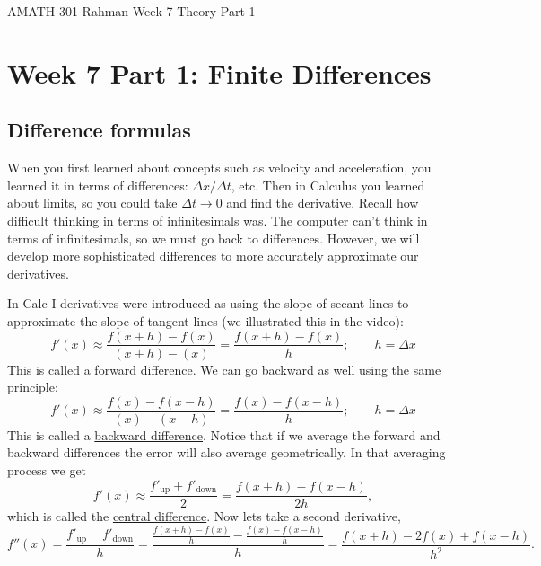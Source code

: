 \documentclass[reqno]{amsart}
\theoremstyle{definition}
\begin{document}
\begin{flushleft}
{\sc \Large AMATH 301 Rahman} \hfill Week 7 Theory Part 1
\bigskip
\end{flushleft}

\newcommand{\R}{\mathbb{R}}
\newcommand{\N}{\mathbb{N}}
\newcommand{\Z}{\mathbb{Z}}
\newcommand{\Q}{\mathbb{Q}}
\renewcommand{\CancelColor}{\color{red}}
\newcommand{\?}{\stackrel{?}{=}}
\renewcommand{\varphi}{\phi}
\newcommand{\card}{\text{Card}}
\newcommand{\bigzero}{\text{\Huge 0}}
\newcommand{\curvearrowdown}{{\color{red}\rotatebox{90}{$\curvearrowleft$}}}
\newcommand{\curvearrowup}{{\color{red}\rotatebox{90}{$\curvearrowright$}}}



\section*{Week 7 Part 1:  Finite Differences}

\subsection*{Difference formulas}

When you first learned about concepts such as velocity and acceleration, you learned it in terms of differences: $\Delta x/\Delta t$, etc.  Then in Calculus you learned about limits, so you could take $\Delta t \rightarrow 0$ and find the derivative.  Recall how difficult thinking in terms of infinitesimals was.  The computer can't think in terms of infinitesimals, so we must go back to differences.  However, we will develop more sophisticated differences to more accurately approximate our derivatives.

In Calc I derivatives were introduced as using the slope of secant lines to approximate the slope of tangent lines (we illustrated this in the video):
%
\begin{equation}
f'(x) \approx \frac{f(x+h) - f(x)}{(x+h) - (x)} = \frac{f(x+h)-f(x)}{h}; \qquad h = \Delta x
\end{equation}
%
{\color{red}This is called a \underline{forward difference}}.  We can go backward as well using the same principle:
%
\begin{equation}
f'(x) \approx \frac{f(x) - f(x-h)}{(x) - (x-h)} = \frac{f(x)-f(x-h)}{h}; \qquad h = \Delta x
\end{equation}
%
{\color{red}This is called a \underline{backward difference}}.  Notice that if we average the forward and backward differences the error will also average geometrically.  In that averaging process we get
%
\begin{equation}
f'(x) \approx \frac{f'_{\text{up}}+f'_{\text{down}}}{2} = \frac{f(x+h) - f(x-h)}{2h},
\end{equation}
%
{\color{red}which is called the \underline{central difference}}.  Now lets take a second derivative,
%
\begin{equation}
f''(x) = \frac{f'_{\text{up}}-f'_{\text{down}}}{h} = \frac{\frac{f(x+h)-f(x)}{h} - \frac{f(x)-f(x-h)}{h}}{h} = \frac{f(x+h) - 2f(x) + f(x-h)}{h^2}.
\end{equation}
\end{document}
